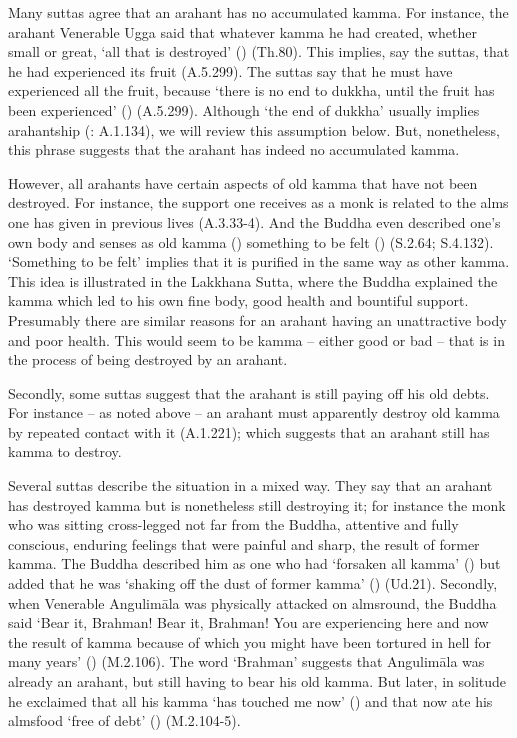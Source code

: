 Many suttas agree that an arahant has no accumulated kamma. For instance, the arahant Venerable Ugga said that whatever kamma he had created, whether small or great, `all that is destroyed' () (Th.80). This implies, say the suttas, that he had experienced its fruit (A.5.299). The suttas say that he must have experienced all the fruit, because `there is no end to dukkha, until the fruit has been experienced' () (A.5.299). Although `the end of dukkha' usually implies arahantship (: A.1.134), we will review this assumption below. But, nonetheless, this phrase suggests that the arahant has indeed no accumulated kamma.

However, all arahants have certain aspects of old kamma that have not been destroyed. For instance, the support one receives as a monk is related to the alms one has given in previous lives (A.3.33-4). And the Buddha even described one's own body and senses as old kamma () something to be felt () (S.2.64; S.4.132). `Something to be felt' implies that it is purified in the same way as other kamma. This idea is illustrated in the Lakkhana Sutta, where the Buddha explained the kamma which led to his own fine body, good health and bountiful support. Presumably there are similar reasons for an arahant having an unattractive body and poor health. This would seem to be kamma -- either good or bad -- that is in the process of being destroyed by an arahant.

Secondly, some suttas suggest that the arahant is still paying off his old debts. For instance -- as noted above -- an arahant must apparently destroy old kamma by repeated contact with it (A.1.221); which suggests that an arahant still has kamma to destroy.

Several suttas describe the situation in a mixed way. They say that an arahant has destroyed kamma but is nonetheless still destroying it; for instance the monk who was sitting cross-legged not far from the Buddha, attentive and fully conscious, enduring feelings that were painful and sharp, the result of former kamma. The Buddha described him as one who had `forsaken all kamma' () but added that he was `shaking off the dust of former kamma' () (Ud.21). Secondly, when Venerable Angulimāla was physically attacked on almsround, the Buddha said `Bear it, Brahman! Bear it, Brahman! You are experiencing here and now the result of kamma because of which you might have been tortured in hell for many years' () (M.2.106). The word `Brahman' suggests that Angulimāla was already an arahant, but still having to bear his old kamma. But later, in solitude he exclaimed that all his kamma `has touched me now' () and that now ate his almsfood `free of debt' () (M.2.104-5).

